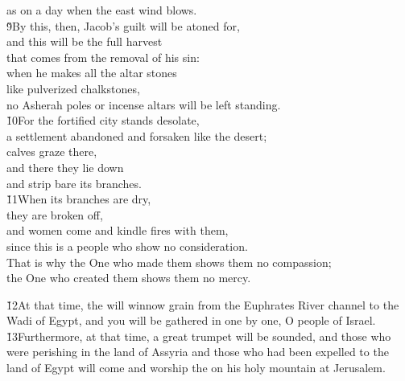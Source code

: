 \begin{poetry}
\poemll    as on a day when the east wind blows. \\
\poeml \v{9}By this, then, Jacob's guilt will be atoned for, \\
\poemll    and this will be the full harvest \\
\poemlll       that comes from the removal of his sin: \\
\poeml when he makes all the altar stones \\
\poemll    like pulverized chalkstones, \\
\poeml no Asherah poles or incense altars will be left standing. \\
\poeml \v{10}For the fortified city stands desolate, \\
\poemll    a settlement abandoned and forsaken like the desert; \\
\poeml calves graze there, \\
\poemll    and there they lie down \\
\poemlll       and strip bare its branches. \\
\poeml \v{11}When its branches are dry, \\
\poemll    they are broken off, \\
\poeml and women come and kindle fires with them, \\
\poemll    since this is a people who show no consideration. \\
\poeml That is why the One who made them shows them no compassion; \\
\poemll    the One who created them shows them no mercy.
\end{poetry}

\v{12}At that time, the  will winnow grain from the Euphrates River channel to the Wadi of Egypt, and you will be gathered in one by one, O people of Israel. \v{13}Furthermore, at that time, a great trumpet will be sounded, and those who were perishing in the land of Assyria and those who had been expelled to the land of Egypt will come and worship the  on his holy mountain at Jerusalem.

